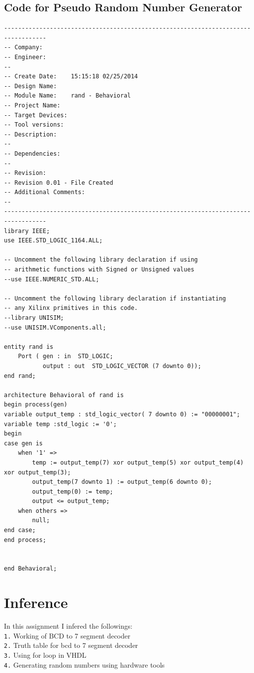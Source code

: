 \documentclass[12pt]{article}
\begin{document}
\subsection{Code for Pseudo Random Number Generator}
\begin{lstlisting}[style=vhdl]
----------------------------------------------------------------------------------
-- Company: 
-- Engineer: 
-- 
-- Create Date:    15:15:18 02/25/2014 
-- Design Name: 
-- Module Name:    rand - Behavioral 
-- Project Name: 
-- Target Devices: 
-- Tool versions: 
-- Description: 
--
-- Dependencies: 
--
-- Revision: 
-- Revision 0.01 - File Created
-- Additional Comments: 
--
----------------------------------------------------------------------------------
library IEEE;
use IEEE.STD_LOGIC_1164.ALL;

-- Uncomment the following library declaration if using
-- arithmetic functions with Signed or Unsigned values
--use IEEE.NUMERIC_STD.ALL;

-- Uncomment the following library declaration if instantiating
-- any Xilinx primitives in this code.
--library UNISIM;
--use UNISIM.VComponents.all;

entity rand is
    Port ( gen : in  STD_LOGIC;
           output : out  STD_LOGIC_VECTOR (7 downto 0));
end rand;

architecture Behavioral of rand is
begin process(gen)
variable output_temp : std_logic_vector( 7 downto 0) := "00000001";
variable temp :std_logic := '0';
begin
case gen is
	when '1' =>
		temp := output_temp(7) xor output_temp(5) xor output_temp(4) xor output_temp(3);
		output_temp(7 downto 1) := output_temp(6 downto 0);
		output_temp(0) := temp;
		output <= output_temp;
	when others =>
		null;
end case;
end process;


end Behavioral;

\end{lstlisting}

\section{Inference}
In this assignment I infered the followings:\\
\verb|1.| Working of BCD to 7 segment decoder \\
\verb|2.| Truth table for bcd to 7 segment decoder \\
\verb|3.| Using for loop in VHDL \\
\verb|4.| Generating random numbers using hardware tools \\
\end{document}
